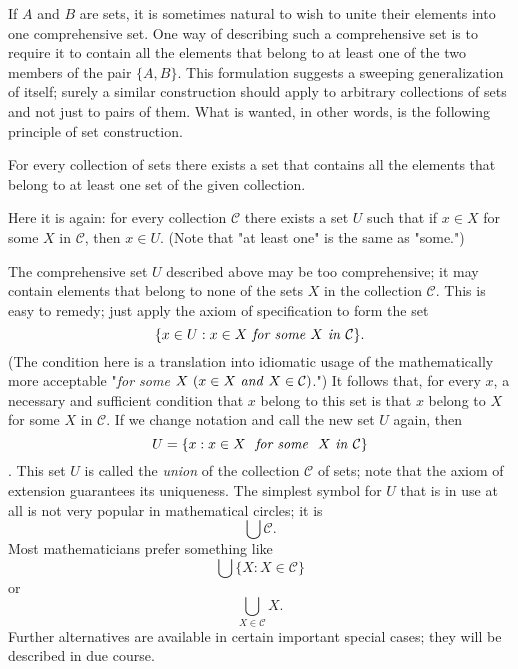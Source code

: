 
If $A$ and $B$ are sets, it is sometimes natural to wish to unite their elements into one comprehensive set. One way of describing such a comprehensive set is to require it to contain all the elements that belong to at least one of the two members of the pair $ \{ A, B \}$. This formulation suggests a sweeping  generalization of itself; surely a similar construction should apply to arbitrary collections of sets and not just to pairs of them. What is wanted, in other words, is the following principle of set construction.

\begin{named}  For every collection of sets there exists a set that contains all the elements that belong to at least one set of the given collection.
\end{named}

Here it is again: for every collection $\mathcal{C}$ there exists a set $U$ such that if $x \in X$ for some $X$ in $\mathcal{C}$, then $ x \in U$. (Note that "at least one" is the same as "some.") 

The comprehensive set $U$ described above may be too comprehensive; it may contain elements that belong to none of the sets $X$ in the collection $\mathcal{C}$. This is easy to remedy; just apply the axiom of specification to form the set 
\begin{equation*}
\{ x \in U: x \in X \text{ \textit{for some} } X \text{ \textit{in} } \mathcal{C} \}.
\end{equation*}
(The condition here is a translation into idiomatic usage of the mathematically more acceptable "\textit{for some} $X\ (x \in X \text{ \textit{and} } X \in \mathcal{C})$.") It follows that, for every $x$, a necessary and sufficient condition that $x$ belong to this set is that $x$ belong to $X$ for some $X$ in $\mathcal{C}$. If we change notation and call the new set $U$ again, then
\begin{equation*}
U = \{ x: x \in X \text{ \textit{ for some } } X \text{ \textit{in} }  \mathcal{C} \}
\end{equation*}.
This set $U$ is called the \textit{union} of the collection $\mathcal{C}$ of sets; note that the axiom of extension guarantees its uniqueness. The simplest symbol for $U$ that is in use at all is not very popular in mathematical circles; it is 
\begin{equation*}
\bigcup \mathcal{C}.
\end{equation*}
Most mathematicians prefer something like 
\begin{equation*}
\bigcup \{ X: X \in \mathcal{C} \}
\end{equation*}
or
\begin{equation*}
\bigcup_{X \in \mathcal{C}} X.
\end{equation*}
Further alternatives are available in certain important special cases; they will be described in due course.

